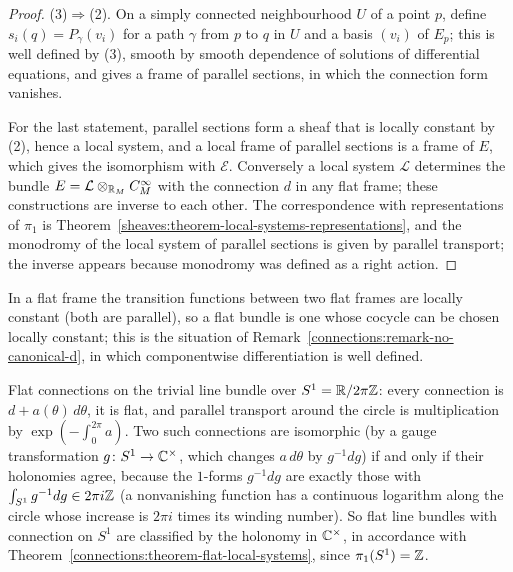 \begin{proof}
(3)$\Rightarrow$(2). On a simply connected neighbourhood $U$ of a point $p$, define $s_i(q) = P_\gamma(v_i)$ for a path $\gamma$ from $p$ to $q$ in $U$ and a basis $(v_i)$ of $E_p$; this is well defined by (3),
smooth by smooth dependence of solutions of differential equations, and gives a frame of parallel sections, in which the connection form vanishes.

For the last statement, parallel sections form a sheaf that is locally constant by (2), hence a local system, and a local frame of parallel sections is a frame of $E$, which gives the isomorphism with
$\mathcal{E}$. Conversely a local system $\mathcal{L}$ determines the bundle $E = \mathcal{L} \otimes_{\mathbb{R}_M} C^\infty_M$ with the connection $d$ in any flat frame; these constructions are inverse to each
other. The correspondence with representations of $\pi_1$ is Theorem~\ref{sheaves:theorem-local-systems-representations}, and the monodromy of the local system of parallel sections is given by parallel
transport; the inverse appears because monodromy was defined as a right action.
\end{proof}

In a flat frame the transition functions between two flat frames are locally constant (both are parallel), so a flat bundle is one whose cocycle can be chosen locally
constant; this is the situation of Remark~\ref{connections:remark-no-canonical-d}, in which componentwise differentiation is well defined.

\begin{example}\label{connections:example-flat-circle}
Flat connections on the trivial line bundle over $S^1 = \mathbb{R}/2\pi\mathbb{Z}$: every connection is $d + a(\theta)\,d\theta$, it is flat, and parallel transport around the circle is multiplication by $\exp(-\int_0^{2\pi}a)$. Two such connections are
isomorphic (by a gauge transformation $g \colon S^1 \to \mathbb{C}^\times$, which changes $a\,d\theta$ by $g^{-1}dg$) if and only if their holonomies agree, because the $1$-forms $g^{-1}dg$ are exactly those with $\int_{S^1}g^{-1}dg \in 2\pi i\mathbb{Z}$
(a nonvanishing function has a continuous logarithm along the circle whose increase is $2\pi i$ times its winding number). So flat line bundles with connection on $S^1$ are classified by the holonomy in $\mathbb{C}^\times$, in accordance with
Theorem~\ref{connections:theorem-flat-local-systems}, since $\pi_1(S^1) = \mathbb{Z}$.
\end{example}


